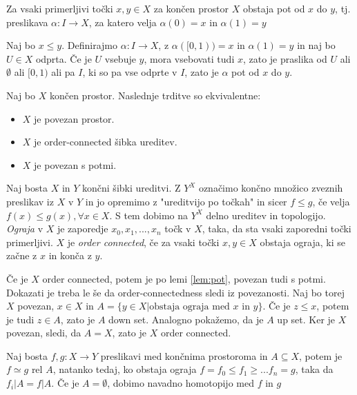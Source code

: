 \begin{lema}\label{lem:pot}
    Za vsaki primerljivi točki $x,y\in X$ za končen prostor $X$ obstaja pot od $x$ do $y$, tj. preslikava $\alpha: I \rightarrow X$, za katero velja $\alpha(0)=x$ in $\alpha(1)=y$

\end{lema}

\begin{dokaz}
Naj bo $x \leq y$. Definirajmo $\alpha:I\rightarrow X$, z $\alpha([0,1))=x$ in $\alpha(1)=y$ in naj bo $U\in X$ odprta. Če je $U$ vsebuje $y$, mora vsebovati tudi $x$, 
zato je praslika od $U$ ali $\emptyset$ ali $[0,1)$ ali pa $I$, ki so pa vse odprte v $I$, zato je $\alpha$ pot od $x$ do $y$.
\end{dokaz}

\begin{lema}
    Naj bo $X$ končen prostor. Naslednje trditve so ekvivalentne:

    \begin{itemize}
        \label{lem:povezanost}
        \item $X$ je povezan prostor.
        \item $X$ je order-connected šibka ureditev.
        \item $X$ je povezan s potmi.
    \end{itemize}
\end{lema}

Naj bosta $X$ in $Y$ končni šibki ureditvi. Z $Y^X$ označimo končno množico zveznih preslikav iz $X$ v $Y$ in jo opremimo z "ureditvijo po točkah" in sicer $f\leq g$, če velja $f(x) \leq g(x), \forall x\in X$. S tem dobimo na $Y^X$ delno ureditev in topologijo. \textit{Ograja} v $X$ je zaporedje $x_0,x_1,...,x_n$ točk v $X$, taka, da sta vsaki zaporedni točki primerljivi. $X$ je \textit{order 
connected}, če za vsaki točki $x,y\in X$ obstaja ograja, ki se začne z $x$ in konča z $y$.

\begin{dokaz}
    Če je $X$ order connected, potem je po lemi \ref{lem:pot}, povezan tudi s potmi.
    Dokazati je treba le še da order-connectedness sledi iz povezanosti. Naj bo torej $X$ povezan, $x\in X$ in $A=\{y\in X| \text{obstaja ograja med $x$ in $y$}\}$. Če 
    je $z\leq x$, potem je tudi $z\in A$, zato je $A$ down set. Analogno pokažemo, da je $A$ up set. Ker je $X$ povezan, sledi, da $A=X$, zato je $X$ order connected.
\end{dokaz}

\begin{izrek}
    \label{iz:ograje}
Naj bosta $f,g: X\rightarrow Y$ preslikavi med končnima prostoroma in $A\subseteq X$, potem je $f\simeq g$ rel $A$, natanko tedaj, ko obstaja ograja $f=f_0\leq f_1\geq ... f_n=g$, taka da $f_i|A=f|A$. Če je $A=\emptyset$, dobimo navadno homotopijo med $f$ in $g$
\end{izrek}


